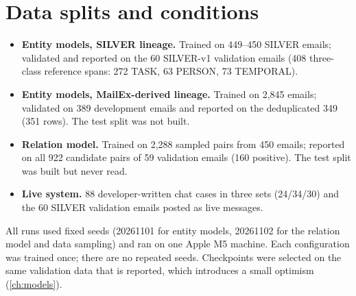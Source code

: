 \section{Data splits and conditions}
\begin{itemize}
  \item \textbf{Entity models, SILVER lineage.} Trained on 449--450 SILVER emails; validated and reported on the 60 SILVER-v1 validation emails (408 three-class reference spans: 272 TASK, 63 PERSON, 73 TEMPORAL).
  \item \textbf{Entity models, MailEx-derived lineage.} Trained on 2,845 emails; validated on 389 development emails and reported on the deduplicated 349 (351 rows). The test split was not built.
  \item \textbf{Relation model.} Trained on 2,288 sampled pairs from 450 emails; reported on all 922 candidate pairs of 59 validation emails (160 positive). The test split was built but never read.
  \item \textbf{Live system.} 88 developer-written chat cases in three sets (24/34/30) and the 60 SILVER validation emails posted as live messages.
\end{itemize}
All runs used fixed seeds (20261101 for entity models, 20261102 for the relation model and data sampling) and ran on one Apple M5 machine. Each configuration was trained once; there are no repeated seeds. Checkpoints were selected on the same validation data that is reported, which introduces a small optimism (\cref{ch:models}).


